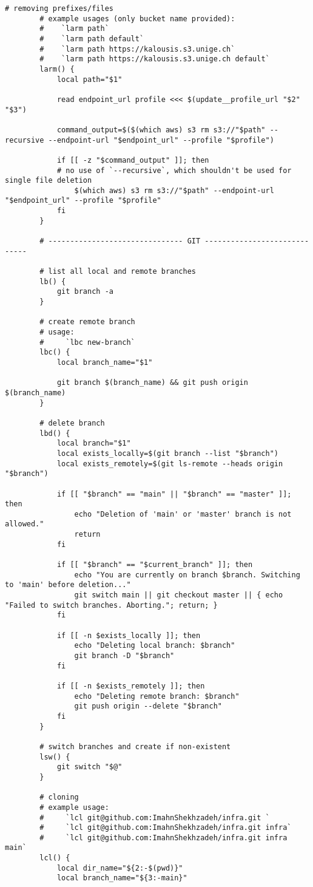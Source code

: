 \documentclass[12pt, a4paper]{scrbook}
\numberwithin{equation}{section}
\theoremstyle{definition}
\theoremstyle{definition}
\begin{document}
\begin{lstlisting}[style=mystylebash, label=alg:bashrc_contents, xleftmargin=\parindent]
		# removing prefixes/files
		# example usages (only bucket name provided):
		#    `larm path`
		#    `larm path default`
		#    `larm path https://kalousis.s3.unige.ch`
		#    `larm path https://kalousis.s3.unige.ch default`
		larm() {
			local path="$1"
			
			read endpoint_url profile <<< $(update__profile_url "$2" "$3")
			
			command_output=$($(which aws) s3 rm s3://"$path" --recursive --endpoint-url "$endpoint_url" --profile "$profile")
			
			if [[ -z "$command_output" ]]; then
			# no use of `--recursive`, which shouldn't be used for single file deletion
				$(which aws) s3 rm s3://"$path" --endpoint-url "$endpoint_url" --profile "$profile"
			fi
		}
		
		# ------------------------------- GIT -----------------------------
		
		# list all local and remote branches
		lb() {
			git branch -a
		}
		
		# create remote branch
		# usage:
		#     `lbc new-branch`
		lbc() {
			local branch_name="$1"

			git branch $(branch_name) && git push origin $(branch_name)
		}
		
		# delete branch
		lbd() {
			local branch="$1"
			local exists_locally=$(git branch --list "$branch")
			local exists_remotely=$(git ls-remote --heads origin "$branch")
			
			if [[ "$branch" == "main" || "$branch" == "master" ]]; then
				echo "Deletion of 'main' or 'master' branch is not allowed."
				return
			fi
			
			if [[ "$branch" == "$current_branch" ]]; then
				echo "You are currently on branch $branch. Switching to 'main' before deletion..."
				git switch main || git checkout master || { echo "Failed to switch branches. Aborting."; return; }
			fi
			
			if [[ -n $exists_locally ]]; then
				echo "Deleting local branch: $branch"
				git branch -D "$branch"
			fi
			
			if [[ -n $exists_remotely ]]; then
				echo "Deleting remote branch: $branch"
				git push origin --delete "$branch"
			fi
		}
		
		# switch branches and create if non-existent
		lsw() {                                                                                                           
			git switch "$@"
		}
	
		# cloning
		# example usage:
		#     `lcl git@github.com:ImahnShekhzadeh/infra.git `
		#     `lcl git@github.com:ImahnShekhzadeh/infra.git infra`
		#     `lcl git@github.com:ImahnShekhzadeh/infra.git infra main`
		lcl() {
			local dir_name="${2:-$(pwd)}"
			local branch_name="${3:-main}"
			

\end{lstlisting}
\end{document}
